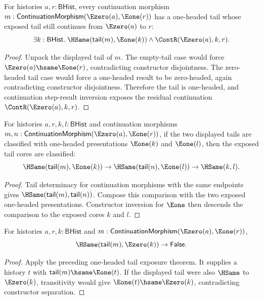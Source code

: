 \begin{theorem}
\label{thm:category-continuation-morphism-e0-source-e1-target-tail-cases}
For histories $a,r:\mathsf{BHist}$, every continuation morphism
$m:\mathsf{ContinuationMorphism}(\Ezero(a),\Eone(r))$ has a one-headed tail
whose exposed tail still continues from $\Ezero(a)$ to $r$:
$$
\exists k:\mathsf{BHist}.\;
\HSame(\mathsf{tail}(m),\Eone(k))\land \ContR(\Ezero(a),k,r).
$$
\end{theorem}
\begin{proof}
Unpack the displayed tail of $m$. The empty-tail case would force
$\Ezero(a)\hsame\Eone(r)$, contradicting constructor disjointness. The
zero-headed tail case would force a one-headed result to be zero-headed, again
contradicting constructor disjointness. Therefore the tail is one-headed, and
continuation step-result inversion exposes the residual continuation
$\ContR(\Ezero(a),k,r)$.
\end{proof}

\begin{theorem}
\label{thm:continuation-morphism-e0-source-e1-target-tail-core-deterministic}
For histories $a,r,k,l:\mathsf{BHist}$ and continuation morphisms
$m,n:\mathsf{ContinuationMorphism}(\Ezero(a),\Eone(r))$, if the two displayed
tails are classified with one-headed presentations
$\Eone(k)$ and $\Eone(l)$, then the exposed tail cores are classified:
$$
\HSame(\mathsf{tail}(m),\Eone(k))\to
\HSame(\mathsf{tail}(n),\Eone(l))\to
\HSame(k,l).
$$
\end{theorem}
\begin{proof}
Tail determinacy for continuation morphisms with the same endpoints gives
$\HSame(\mathsf{tail}(m),\mathsf{tail}(n))$. Compose this comparison with the
two exposed one-headed presentations. Constructor inversion for $\Eone$ then
descends the comparison to the exposed cores $k$ and $l$.
\end{proof}

\begin{theorem}
\label{thm:category-continuation-e0-source-e1-target-tail-e0-absurd}
For histories $a,r,k:\mathsf{BHist}$ and
$m:\mathsf{ContinuationMorphism}(\Ezero(a),\Eone(r))$,
$$
\HSame(\mathsf{tail}(m),\Ezero(k))\to\mathsf{False}.
$$
\end{theorem}
\begin{proof}
Apply the preceding one-headed tail exposure theorem. It supplies a history
$t$ with $\mathsf{tail}(m)\hsame\Eone(t)$. If the displayed tail were also
$\HSame$ to $\Ezero(k)$, transitivity would give
$\Eone(t)\hsame\Ezero(k)$, contradicting constructor separation.
\end{proof}

